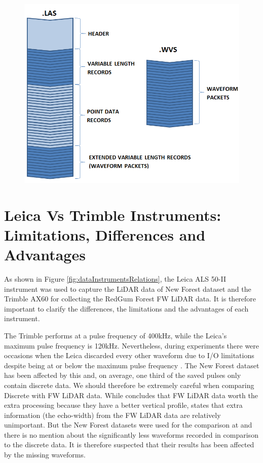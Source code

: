 \documentclass{subfiles}
\begin{document}
	 \begin{figure}[!htbp]
           \centering
           \includegraphics[width=\textwidth/3*2]{img/LAS1_3_fileFormat}
           \caption[Airborne LiDAR system]{}
           \label{fig:LAS1_3_fileFormat}
      \end{figure}

	\section{Leica Vs Trimble Instruments: Limitations, Differences and Advantages}\label{sec:LeicaVsTrimble}
	
	
	\par As shown in Figure \ref{fig:dataInstrumentsRelations}, the Leica ALS 50-II instrument was used to capture the LiDAR data of New Forest dataset and the Trimble AX60 for collecting the RedGum Forest FW LiDAR data. It is therefore important to clarify the differences, the limitations and the advantages of each instrument. 
	
	\par The Trimble performs at a pulse frequency of 400kHz, while the Leica's maximum pulse frequency is 120kHz. Nevertheless, during experiments there were occasions when the Leica discarded every other waveform due to I/O limitations despite being at or below the maximum pulse frequency \cite{Warren2012}. The New Forest dataset has been affected by this and, on average, one third of the saved pulses only contain discrete data. We should therefore be extremely careful when comparing Discrete with FW LiDAR data. While \cite{Anderson2015} concludes that FW LiDAR data worth the extra processing because they have a better vertical profile, \cite{Sumnall2016} states that extra information (the echo-width) from the FW LiDAR data are relatively unimportant. But the New Forest datasets were used for the comparison at \cite{Sumnall2016} and there is no mention about the significantly less waveforms recorded in comparison to the discrete data. It is therefore suspected that their results has been affected by the missing waveforms. 
	
\end{document}
